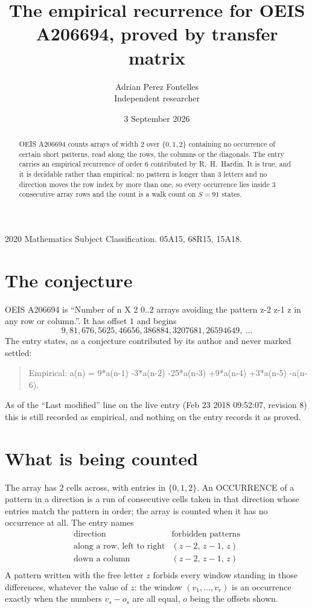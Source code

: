 \documentclass[11pt,a4paper]{article}
\title{The empirical recurrence for OEIS A206694, proved by transfer matrix}
\author{Adrian Perez Fontelles\\ \small Independent researcher}
\date{3 September 2026}
\theoremstyle{plain}
\theoremstyle{definition}
\begin{document}
\maketitle

\begin{abstract}
OEIS A206694 counts arrays of width $2$ over $\{0,1,2\}$ containing no occurrence of certain short
patterns, read along the rows, the columns or the diagonals. The entry carries an empirical
recurrence of order $6$ contributed by R.~H.~Hardin. It is true, and it is decidable
rather than empirical: no pattern is longer than $3$ letters and no direction moves the row
index by more than one, so every occurrence lies inside $3$ consecutive array rows and the
count is a walk count on $S=91$ states.
\end{abstract}

\noindent\small 2020 Mathematics Subject Classification. 05A15, 68R15, 15A18.\normalsize

\section{The conjecture}

OEIS A206694 is ``Number of n X 2 0..2 arrays avoiding the pattern z-2 z-1 z in any row or column.''. It has offset $1$ and begins
\[
9, 81, 676, 5625, 46656, 386884, 3207681, 26594649,\ \dots
\]
The entry states, as a conjecture contributed by its author and never marked settled:
\begin{quote}
Empirical: a(n) = 9*a(n-1) -3*a(n-2) -25*a(n-3) +9*a(n-4) +3*a(n-5) -a(n-6).
\end{quote}
As of the ``Last modified'' line on the live entry (Feb 23 2018 09:52:07, revision 8) this is still
recorded as empirical, and nothing on the entry records it as proved.

\section{What is being counted}

The array has $2$ cells across, with entries in $\{0,1,2\}$. An OCCURRENCE of a pattern in a
direction is a run of consecutive cells taken in that direction whose entries match the pattern
in order; the array is counted when it has no occurrence at all. The entry names
\[
\begin{array}{ll}
\text{direction} & \text{forbidden patterns} \\[2pt]
\text{along a row, left to right} & (z-2,\,z-1,\,z) \\
\text{down a column} & (z-2,\,z-1,\,z) \\
\end{array}
\]
 A pattern written with the free letter $z$ forbids every window standing in those differences, whatever the value of $z$: the window $(v_1,\dots,v_r)$ is an occurrence exactly when the numbers $v_s-o_s$ are all equal, $o$ being the offsets shown.
\end{document}
